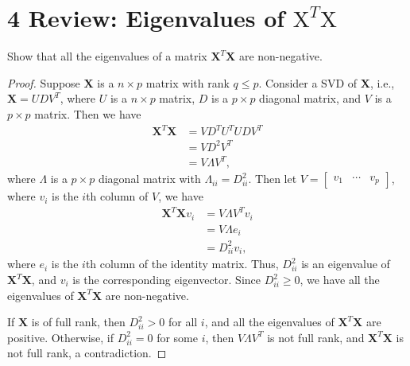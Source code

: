 \documentclass[10pt]{article}
\begin{document}
\section*{4 Review: Eigenvalues of $\mathrm{X}^{T} \mathrm{X}$}
Show that all the eigenvalues of a matrix $\mathbf{X}^{T} \mathbf{X}$ are non-negative.
\begin{proof}

    Suppose $\mathbf{X}$ is a $n\times p$ matrix with rank $q\leq p$. Consider a SVD of $\mathbf{X}$, i.e., $\mathbf{X} = UDV^{T}$, where $U$ is a $n\times p$ matrix, $D$ is a $p\times p$ diagonal matrix, and $V$ is a $p\times p$ matrix. Then we have
    \begin{align*}
        \mathbf{X}^{T} \mathbf{X} &= VD^{T}U^{T}UDV^{T}\\
        &= VD^{2}V^{T}\\
        &= V\Lambda V^{T},
    \end{align*}
    where $\Lambda$ is a $p\times p$ diagonal matrix with $\Lambda_{ii} = D_{ii}^{2}$. Then let $V=\begin{bmatrix}v_1 & \cdots & v_p\end{bmatrix}$, where $v_i$ is the $i$th column of $V$, we have
    \begin{align*}
        \mathbf{X}^{T} \mathbf{X} v_i &= V\Lambda V^{T}v_i\\
        &= V\Lambda e_i\\
        &= D_{ii}^{2}v_i,
    \end{align*}
    where $e_i$ is the $i$th column of the identity matrix. Thus, $D_{ii}^{2}$ is an eigenvalue of $\mathbf{X}^{T} \mathbf{X}$, and $v_i$ is the corresponding eigenvector. Since $D_{ii}^{2}\geq 0$, we have all the eigenvalues of $\mathbf{X}^{T} \mathbf{X}$ are non-negative. 
    
    If $\mathbf{X}$ is of full rank, then $D_{ii}^{2}>0$ for all $i$, and all the eigenvalues of $\mathbf{X}^{T} \mathbf{X}$ are positive. Otherwise, if $D_{ii}^{2}=0$ for some $i$, then $V\Lambda V^{T}$ is not full rank, and $\mathbf{X}^{T} \mathbf{X}$ is not full rank, a contradiction.
\end{proof}
\end{document}
